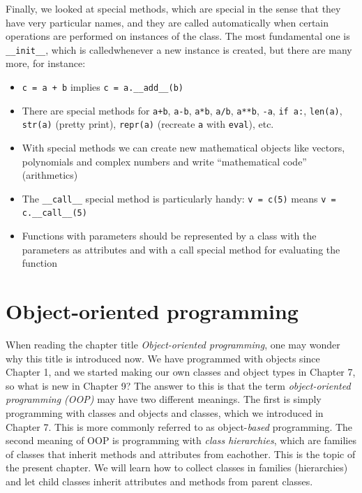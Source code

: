 \documentclass[graybox,envcountchap,sectrefs,final]{svmonodo}
\begin{document}
Finally, we looked at special methods, which are special in the sense that they have very particular
names, and they are called automatically when certain operations are performed on instances of the
class. The most fundamental one is \Verb!__init__!, which is calledwhenever a new instance is created, but
there are many more, for instance:
\begin{itemize}
  \item \texttt{c = a + b} implies \Verb!c = a.__add__(b)!

  \item There are special methods for \texttt{a+b}, \texttt{a-b}, \texttt{a*b}, \texttt{a/b}, \texttt{a**b}, \texttt{-a}, \texttt{if a:}, \texttt{len(a)}, \texttt{str(a)} (pretty print), \texttt{repr(a)} (recreate \texttt{a} with \texttt{eval}), etc.

  \item With special methods we can create new mathematical objects like vectors, polynomials and complex numbers and write ``mathematical code'' (arithmetics)

  \item The \Verb!__call__! special method is particularly handy: \texttt{v = c(5)} means \Verb!v = c.__call__(5)!

  \item Functions with parameters should be represented by a class with the parameters as attributes and with a call special method for evaluating the function
\end{itemize}

\noindent
\chapter{Object-oriented programming}
\label{ch:oop}

When reading the chapter title \emph{Object-oriented programming}, one may wonder
why this title is introduced now. We have programmed with
objects since Chapter 1, and we started making our own classes and object types
in Chapter 7, so what is new in Chapter 9? The answer to this is that
the term \emph{object-oriented programming (OOP)} may have two different meanings.
The first is simply programming with classes and objects and classes, which
we introduced in Chapter 7. This is more commonly
referred to as object-\emph{based} programming. The second meaning
of OOP is programming with \emph{class hierarchies},  which are
families of classes that inherit methods and attributes from eachother.
This is the topic of the present chapter. We will learn how to collect
classes in families (hierarchies) and let child classes inherit
attributes and methods from parent classes.
\end{document}
